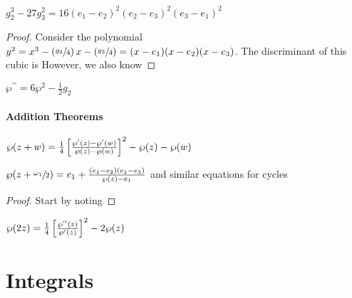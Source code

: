 \documentclass{article}
\begin{document}
\begin{lemma}
	$g_2^3 - 27g_3^2 = 16(e_1 - e_2)^2(e_2 - e_3)^2 (e_3 - e_1)^2$
\end{lemma}
\begin{proof}
	Consider the polynomial $y^2 = x^3 - \left( \sfrac{g_2}{4} \right)x - \left( \sfrac{g_3}{4} \right) = (x-e_1)(x-e_2)(x-e_3)$. The discriminant of this cubic is 
However, we also know 
\end{proof}


\begin{corollary}
	$\wp^{\prime \prime} = 6\wp^2 - \frac{1}{2}g_2
$\end{corollary}

\subsection{Addition Theorems}

\begin{prop}
	$\wp(z+w) = \frac{1}{4} \left[ \frac{\wp^\prime(z) - \wp^\prime(w)}{\wp(z) - \wp(w)} \right]^2 - \wp(z) - \wp(w)$
\end{prop}
\begin{corollary}
	$\wp(z + \sfrac{\omega_1}{2}) = e_1 + \frac{(e_1 - e_2)(e_1 - e_3)}{\wp(z) - e_1}$ and similar equations for cycles 
\end{corollary}
\begin{proof}
	Start by noting 
\end{proof}


\begin{corollary}
	$\wp(2z) = \frac{1}{4} \left[ \frac{\wp^{\prime \prime}(z)}{\wp^\prime(z)} \right]^2 - 2\wp(z)$
\end{corollary}
\part{Integrals}

\end{document}
